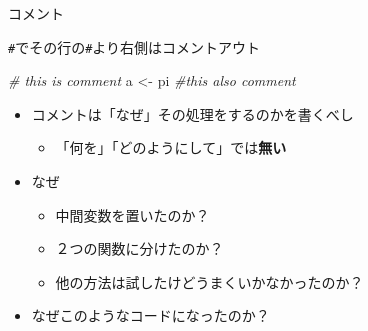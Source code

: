 \documentclass[ignorenonframetext,]{beamer}
\newenvironment{Shaded}{\begin{snugshade}}{\end{snugshade}}
\newcommand{\StringTok}[1]{\textcolor[rgb]{0.31,0.60,0.02}{#1}}
\newcommand{\CommentTok}[1]{\textcolor[rgb]{0.56,0.35,0.01}{\textit{#1}}}
\newcommand{\NormalTok}[1]{#1}
\providecommand{\tightlist}{%
  \setlength{\itemsep}{0pt}\setlength{\parskip}{0pt}}
\begin{document}
\begin{frame}[fragile]{コメント}

\texttt{\#}でその行の\texttt{\#}より右側はコメントアウト

\begin{Shaded}
\begin{Highlighting}[]
\CommentTok{# this is comment}
\NormalTok{a <-}\StringTok{ }\NormalTok{pi }\CommentTok{#this also comment}
\end{Highlighting}
\end{Shaded}

\begin{itemize}
\tightlist
\item
  コメントは「なぜ」その処理をするのかを書くべし

  \begin{itemize}
  \tightlist
  \item
    「何を」「どのようにして」では\textbf{無い}
  \end{itemize}
\item
  なぜ

  \begin{itemize}
  \tightlist
  \item
    中間変数を置いたのか？
  \item
    ２つの関数に分けたのか？
  \item
    他の方法は試したけどうまくいかなかったのか？
  \end{itemize}
\item
  なぜこのようなコードになったのか？
\end{itemize}

\end{frame}
\end{document}
